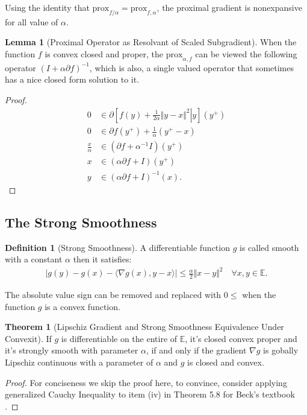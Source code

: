 \documentclass[]{article}
\theoremstyle{definition}
\newtheorem{theorem}{Theorem}       %
\newtheorem{lemma}{Lemma}[subsection]  %
\newtheorem{definition}{Definition}
\begin{document}
        Using the identity that $\text{prox}_{f/\alpha} = \text{prox}_{f, \alpha}$, the proximal gradient is nonexpansive for all value of $\alpha$. 
        \begin{lemma}[Proximal Operator as Resolvant of Scaled Subgradient]\label{lemma:prox_alternative_form}
            When the function $f$ is convex closed and proper, the $\text{prox}_{\alpha, f}$ can be viewed the following operator $(I + \alpha \partial f)^{-1}$, which is also, a single valued operator that sometimes has a nice closed form solution to it.
        \end{lemma}
        \begin{proof}
            \begin{align*}
                0 &\in \partial\left[
                    \left.
                        f(y) + \frac{1}{2\alpha} \Vert y - x\Vert^2 
                    \right| y
                \right](y^+)
                \\
                0 &\in \partial f(y^+) + \frac{1}{\alpha}(y^+ - x)
                \\
                \frac{x}{\alpha} &\in 
                (\partial f + \alpha^{-1}I)(y^+)
                \\
                x &\in 
                (\alpha \partial f + I)(y^+)
                \\
                y &\in (\alpha\partial f+ I)^{-1}(x).
            \end{align*}
        \end{proof}
    \subsection{The Strong Smoothness}
        \begin{definition}[Strong Smoothness]\label{def:strong_smoothness}
            A differentiable function $g$ is called smooth with a constant $\alpha$ then it satisfies: 
            \begin{align}
                |g(y) - g(x) - 
                \langle \nabla g(x), y - x
                \rangle| \le \frac{\alpha}{2}\Vert x - y\Vert^2
                \quad \forall x, y\in \mathbb E. 
            \end{align}    
        \end{definition}
        The absolute value sign can be removed and replaced with $0\le$ when the function $g$ is a convex function.
        \begin{theorem}[Lipschiz Gradient and Strong Smoothness Equivalence Under Convexit]\label{thm:cvx_lipz_grad}
            If $g$ is differentiable on the entire of $\mathbb E$, it's closed convex proper and it's strongly smooth with parameter $\alpha$, if and only if the gradient $\nabla g$ is gobally Lipschiz continuous with a parameter of $\alpha$ and $g$ is closed and convex. 
        \end{theorem}
        \begin{proof}
            For conciseness we skip the proof here, to convince, consider applying generalized Cauchy Inequality to item (iv) in Theorem 5.8 for Beck's textbook \cite{paper:FISTA}. 
        \end{proof}
        
\end{document}
